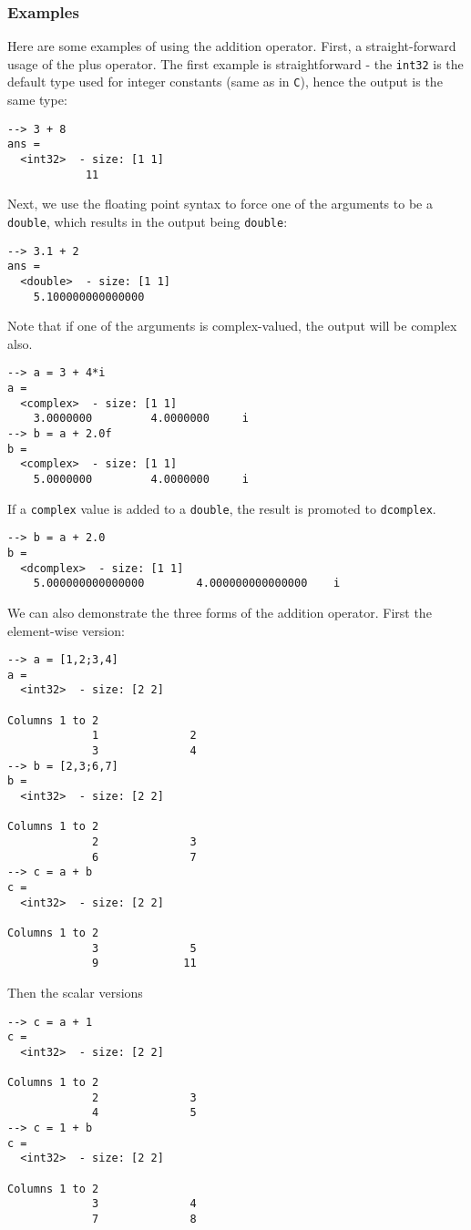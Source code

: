\subsubsection{Examples}
Here are some examples of using the addition operator.  First, a 
straight-forward usage of the plus operator.  The first example
is straightforward - the \verb|int32| is the default type used for
integer constants (same as in \verb|C|), hence the output is the
same type:
\begin{verbatim}
--> 3 + 8
ans =
  <int32>  - size: [1 1]
            11
\end{verbatim}
Next, we use the floating point syntax to force one of the arguments
to be a \verb|double|, which results in the output being \verb|double|:
\begin{verbatim}
--> 3.1 + 2
ans =
  <double>  - size: [1 1]
    5.100000000000000
\end{verbatim}
Note that if one of the arguments is complex-valued, the output will be
complex also.
\begin{verbatim}
--> a = 3 + 4*i
a =
  <complex>  - size: [1 1]
    3.0000000         4.0000000     i
--> b = a + 2.0f
b =
  <complex>  - size: [1 1]
    5.0000000         4.0000000     i
\end{verbatim}
If a \verb|complex| value is added to a \verb|double|, the result is 
promoted to \verb|dcomplex|.
\begin{verbatim}
--> b = a + 2.0
b =
  <dcomplex>  - size: [1 1]
    5.000000000000000        4.000000000000000    i
\end{verbatim}
We can also demonstrate the three forms of the addition operator.  First
the element-wise version:
\begin{verbatim}
--> a = [1,2;3,4]
a =
  <int32>  - size: [2 2]
  
Columns 1 to 2
             1              2
             3              4
--> b = [2,3;6,7]
b =
  <int32>  - size: [2 2]
  
Columns 1 to 2
             2              3
             6              7
--> c = a + b
c =
  <int32>  - size: [2 2]
  
Columns 1 to 2
             3              5
             9             11
\end{verbatim}
Then the scalar versions
\begin{verbatim}
--> c = a + 1
c =
  <int32>  - size: [2 2]
  
Columns 1 to 2
             2              3
             4              5
--> c = 1 + b
c =
  <int32>  - size: [2 2]
  
Columns 1 to 2
             3              4
             7              8
\end{verbatim}
